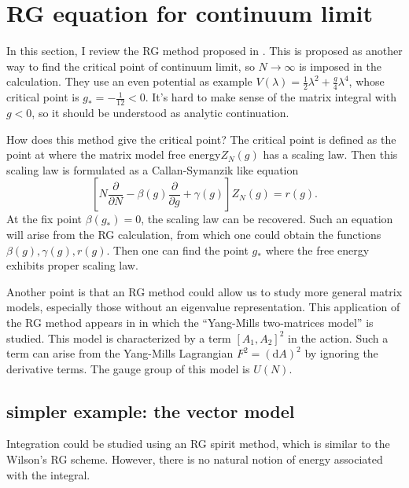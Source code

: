 \section{RG equation for continuum limit}

In this section, I review the RG method proposed in 
.
This is proposed as another way to find the critical point of continuum limit,
so $N\to\infty$ is imposed in the calculation.
They use an even potential as example $V(\lambda)=\frac{1}{2}\lambda^2+\frac{g}{4}\lambda^4$,
whose critical point is $g_*=-\frac{1}{12}<0$.
It's hard to make sense of the matrix integral with $g<0$, so it should be understood as analytic continuation.

How does this method give the critical point?
The critical point is defined as the point at where the matrix model free energy$Z_N(g)$ has a scaling law.
Then this scaling law is formulated as a Callan-Symanzik like equation
\[
	\left[N \frac{\partial}{\partial N}- \beta(g)\frac{\partial}{\partial g}+\gamma(g)\right]Z_N(g) = r(g)
.\]
At the fix point $\beta(g_*)=0$, the scaling law can be recovered.
Such an equation will arise from the RG calculation, from which one could obtain the functions $\beta(g),\gamma(g),r(g)$.
Then one can find the point $g_*$ where the free energy exhibits proper scaling law.

Another point is that
an RG method could allow us to study more general matrix models,
especially those without an eigenvalue representation.
This application of the RG method appears in
in which the ``Yang-Mills two-matrices model'' is studied.
This model is characterized by a term $[A_1,A_2]^2$ in the action.
Such a term can arise from the Yang-Mills Lagrangian $F^2=(\mathrm{d}A)^2$ by ignoring the derivative terms.
The gauge group of this model is $U(N)$.

\subsection{simpler example: the vector model}
Integration could be studied using an RG spirit method,
which is similar to the Wilson's RG scheme.
However, there is no natural notion of energy associated with the integral.

